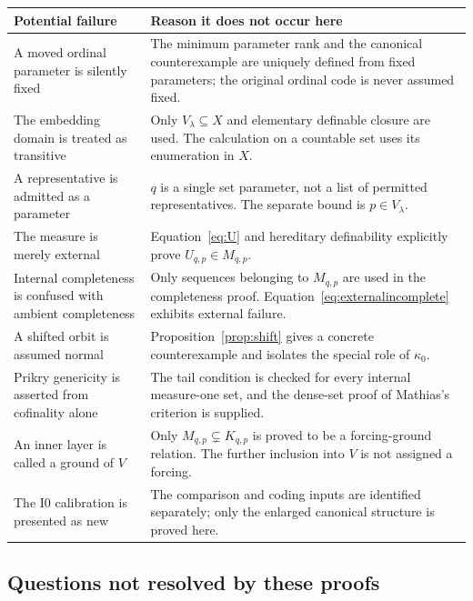 \documentclass[11pt,letterpaper]{article}
\theoremstyle{definition}
\numberwithin{equation}{section}
\newcommand{\Izero}{\mathrm{I0}}
\begin{document}
\begin{center}
\small
\renewcommand{\arraystretch}{1.2}
\begin{tabularx}{\textwidth}{@{}P{.32\textwidth}Y@{}}
\toprule
\textbf{Potential failure}&\textbf{Reason it does not occur here}\\\midrule
A moved ordinal parameter is silently fixed&The minimum parameter rank and the canonical counterexample are uniquely defined from fixed parameters; the original ordinal code is never assumed fixed.\\
The embedding domain is treated as transitive&Only $V_\lambda\subseteq X$ and elementary definable closure are used. The calculation on a countable set uses its enumeration in $X$.\\
A representative is admitted as a parameter&$q$ is a single set parameter, not a list of permitted representatives. The separate bound is $p\in V_\lambda$.\\
The measure is merely external&Equation~\eqref{eq:U} and hereditary definability explicitly prove $U_{q,p}\in M_{q,p}$.\\
Internal completeness is confused with ambient completeness&Only sequences belonging to $M_{q,p}$ are used in the completeness proof. Equation~\eqref{eq:externalincomplete} exhibits external failure.\\
A shifted orbit is assumed normal&Proposition~\ref{prop:shift} gives a concrete counterexample and isolates the special role of $\kappa_0$.\\
Prikry genericity is asserted from cofinality alone&The tail condition is checked for every internal measure-one set, and the dense-set proof of Mathias's criterion is supplied.\\
An inner layer is called a ground of $V$&Only $M_{q,p}\subsetneq K_{q,p}$ is proved to be a forcing-ground relation. The further inclusion into $V$ is not assigned a forcing.\\
The $\Izero$ calibration is presented as new&The comparison and coding inputs are identified separately; only the enlarged canonical structure is proved here.\\
\bottomrule
\end{tabularx}
\end{center}

\subsection{Questions not resolved by these proofs}
\end{document}
